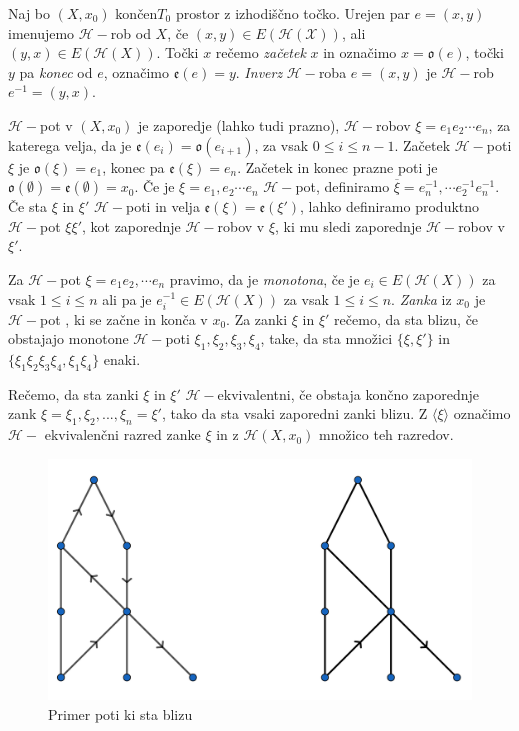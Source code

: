 \documentclass[mat1]{fmfdelo}
\DeclareRobustCommand{\h}{
    \mathcal{H}}
\DeclareRobustCommand{\pot}{
    $\h-$pot
}
\begin{document}
\begin{definicija}
    Naj bo $(X,x_0)$ končen$T_0$ prostor z izhodiščno točko. Urejen par 
$e=(x,y)$ imenujemo $\mathcal{H}-$rob od $X$, če $(x,y)\in 
E(\mathcal{H}(\mathcal{X}))$, ali $(y,x)\in 
E(\h(X))$. Točki $x$ rečemo \textit{začetek} $x$ in označimo 
$x=\mathfrak{o}(e)$, točki $y$ pa \textit{konec} od $e$, 
označimo $\mathfrak{e}(e)=y$. \textit{Inverz} $\h-$roba $e=(x,y)$ je $\h-$rob $e^{-1}=(y,x)$.

$\h-$pot v $(X,x_0)$ je zaporedje (lahko tudi prazno), $\h-$robov $\xi=e_1e_2\cdots e_n$, 
za katerega velja, da je $\mathfrak{e}(e_i)=\mathfrak{o}(e_{i+1})$, za vsak $0\leq i \leq n-1$.
 Začetek $\h-$poti $\xi$ je  $\mathfrak{o}(\xi)=e_1$, konec pa $\mathfrak{e}(\xi)=e_n$.
 Začetek in konec prazne poti je $\mathfrak{o}(\emptyset)=\mathfrak{e}(\emptyset)=x_0$.
 Če je $\xi=e_1,e_2\cdots e_n$ $\h-$pot, definiramo $\overline{\xi}=e_n^{-1},\cdots 
 e_2^{-1}e_n^{-1}$. Če sta $\xi$ in $\xi'$ $\h-$poti in velja $\mathfrak{e}(\xi)=
 \mathfrak{e}(\xi')$, lahko definiramo produktno \pot $\xi\xi'$, kot zaporednje 
 $\h-$robov v $\xi$, ki mu sledi zaporednje $\h-$robov v $\xi'$.

 Za \pot $\xi=e_1e_2,\cdots e_n$ pravimo, da je \textit{monotona}, če je $e_i\in 
 E(\h(X))$ za vsak $1\leq i \leq n$ ali pa je $e_i^{-1}\in E(\h(X))$ za vsak $1\leq i \leq n$.
 \textit{Zanka} iz $x_0$ je \pot, ki se začne in konča v $x_0$. Za zanki $\xi$ in
  $\xi'$ rečemo, da sta blizu, če obstajajo monotone $\h-$poti $\xi_1,\xi_2,\xi_3,\xi_4$,
   take, da  sta množici $\{\xi,\xi'\}$ in $\{\xi_1\xi_2\xi_3\xi_4,\xi_1\xi_4\}$ enaki.

   Rečemo, da sta zanki $\xi$ in $\xi'$ $\h-$ekvivalentni, če obstaja končno zaporednje zank $\xi=\xi_1,\xi_2,...,\xi_n=\xi'$, tako da sta vsaki zaporedni zanki blizu. Z $\langle\xi\rangle$ označimo $\h-$ ekvivalenčni razred zanke $\xi$ in z $\mathscr{H}(X,x_0)$ množico teh razredov.
\end{definicija}

\begin{figure}[h!]
    \centering
    \includegraphics[width=0.6\linewidth]{poti.png}
  \caption{Primer poti ki sta blizu}
  \end{figure}
\end{document}
